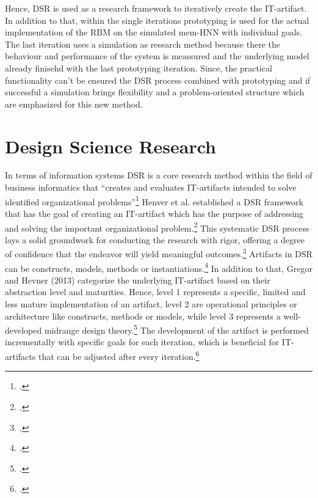 Hence, \ac{DSR} is used as a research framework to iteratively create the \ac{IT}-artifact. 
In addition to that, within the single iterations prototyping is used for the actual implementation of the \ac{RBM} on the simulated \ac{mem-HNN} with individual goals.
The last iteration uses a simulation as research method because there the behaviour and performance of the system is meassured and the underlying model already finisehd with the last prototyping iteration. 
Since, the practical functionality can't be ensured the \ac{DSR} process combined with prototyping and if successful a simulation 
brings flexibility and a problem-oriented structure which are emphasized for this new method. 

\section{Design Science Research}

In terms of information systems \ac{DSR} is a core research method within the field of business informatics that ``creates and evaluates \ac{IT}-artifacts intended to solve identified organizational problems''\footcite[77]{hevnerDesignScienceInformation2004a}
Henver et al. established a DSR framework that has the goal of creating an \ac{IT}-artifact which has the purpose of addressing and solving the important organizational problem.\footcite[82]{hevnerDesignScienceInformation2004a}
This systematic \ac{DSR} process lays a solid groundwork for conducting the research with rigor, offering a degree of confidence that the endeavor will yield meaningful outcomes.\footcite[cf.][368]{baskervilleDesignScienceResearch2018}
Artifacts in \ac{DSR} can be constructs, models, methods or instantiations.\footcite[77]{hevnerDesignScienceInformation2004a}
In addition to that, Gregor and Hevner (2013) categorize the underlying \ac{IT}-artifact based on their abstraction level and maturities.
Hence, level 1 represents a specific, limited and less mature implementation of an artifact, level 2 are operational principles or architecture like constructs, methods or models, while level 3 represents a well-developed midrange design theory.\footcite[cf.][342]{gregorPositioningPresentingDesign2013}
The development of the artifact is performed incrementally with specific goals for each iteration, which is beneficial for \ac{IT}-artifacts that can be adjusted after every iteration.\footcite[cf.][343]{gregorPositioningPresentingDesign2013}

